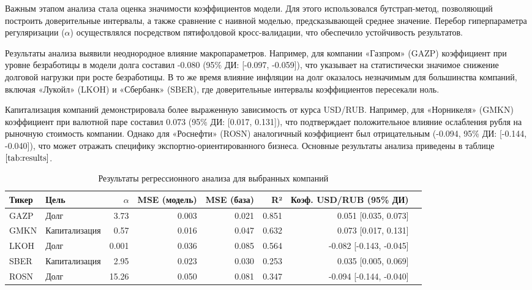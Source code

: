 \documentclass[]{article}
\begin{document}
	Важным этапом анализа стала оценка значимости коэффициентов модели. Для этого использовался бутстрап-метод, позволяющий построить доверительные интервалы, а также сравнение с наивной моделью, предсказывающей среднее значение. Перебор гиперпараметра регуляризации ($\alpha$) осуществлялся посредством пятифолдовой кросс-валидации, что обеспечило устойчивость результатов.
	
	Результаты анализа выявили неоднородное влияние макропараметров. Например, для компании «Газпром» (GAZP) коэффициент при уровне безработицы в модели долга составил -0.080 (95\% ДИ: [-0.097, -0.059]), что указывает на статистически значимое снижение долговой нагрузки при росте безработицы. В то же время влияние инфляции на долг оказалось незначимым для большинства компаний, включая «Лукойл» (LKOH) и «Сбербанк» (SBER), где доверительные интервалы коэффициентов пересекали ноль.
	
	Капитализация компаний демонстрировала более выраженную зависимость от курса USD/RUB. Например, для «Норникеля» (GMKN) коэффициент при валютной паре составил 0.073 (95\% ДИ: [0.017, 0.131]), что подтверждает положительное влияние ослабления рубля на рыночную стоимость компании. Однако для «Роснефти» (ROSN) аналогичный коэффициент был отрицательным (-0.094, 95\% ДИ: [-0.144, -0.040]), что может отражать специфику экспортно-ориентированного бизнеса. Основные результаты анализа приведены в таблице $\ref{tab:results}$.
	
	\begin{table}[ht]
		\centering
		\caption{Результаты регрессионного анализа для выбранных компаний}
		\label{tab:results}
		\begin{tabular}{|l|l|r|r|r|r|r|r|}
			\hline
			Тикер & Цель & $\alpha$ & MSE (модель) & MSE (база) & R² & Коэф. USD/RUB (95\% ДИ) \\ 
			\hline
			GAZP & Долг & 3.73 & 0.003 & 0.021 & 0.851 & 0.051 [0.035, 0.073] \\  
			GMKN & Капитализация & 0.57 & 0.016 & 0.047 & 0.632 & 0.073 [0.017, 0.131] \\  
			LKOH & Долг & 0.001 & 0.036 & 0.085 & 0.564 & -0.082 [-0.143, -0.045] \\  
			SBER & Капитализация & 2.95 & 0.023 & 0.030 & 0.253 & 0.035 [0.005, 0.069] \\  
			ROSN & Долг & 15.26 & 0.050 & 0.081 & 0.347 & -0.094 [-0.144, -0.040] \\  
			\hline
		\end{tabular}
	\end{table}
	
\end{document}
